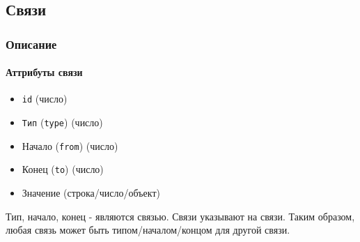 \subsection{Связи}

\subsubsection{Описание}

\paragraph{Аттрибуты связи}

\begin{itemize}
      \item \texttt{id} (число)
      \item \texttt{Тип} (\texttt{type}) (число)
      \item Начало (\texttt{from}) (число)
      \item Конец (\texttt{to}) (число)
      \item Значение (строка/число/объект)
\end{itemize}

Тип, начало, конец - являются связью. Связи указывают на связи. Таким образом,
любая связь может быть типом/началом/концом для другой связи.

